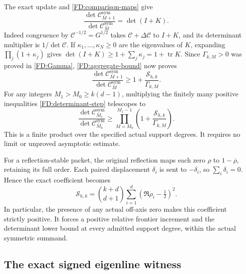 The exact update and \eqref{FD:comparison-maps} give
\begin{equation}
\frac{\det\mathcal C_{M+1}^{\mathrm{sym}}}
{\det\mathcal C_M^{\mathrm{sym}}}=\det(I+K).
\tag{FD.37}\label{FD:determinant-identity}
\end{equation}
Indeed congruence by \(\mathcal C^{-1/2}=G^{1/2}\) takes
\(\mathcal C+\Delta\mathcal C\) to \(I+K\), and its determinant
multiplier is \(1/\det\mathcal C\).  If
\(\kappa_1,\ldots,\kappa_N\ge0\) are the eigenvalues of \(K\),
expanding \(\prod_j(1+\kappa_j)\) gives
\(\det(I+K)\ge1+\sum_j\kappa_j=1+\operatorname{tr}K\).
Since \(\Gamma_{k,M}>0\) was proved in \eqref{FD:Gamma},
\eqref{FD:aggregate-bound} now proves
\begin{equation}
\boxed{\frac{\det\mathcal C_{M+1}^{\mathrm{sym}}}
{\det\mathcal C_M^{\mathrm{sym}}}
\ge1+\frac{\mathcal S_{h,k}}{\Gamma_{k,M}}.}
\tag{FD.38}\label{FD:determinant-step}
\end{equation}
For any integers \(M_1>M_0\ge k(d-1)\), multiplying the finitely many
positive inequalities \eqref{FD:determinant-step} telescopes to
\begin{equation}
\boxed{\frac{\det\mathcal C_{M_1}^{\mathrm{sym}}}
{\det\mathcal C_{M_0}^{\mathrm{sym}}}
\ge\prod_{M=M_0}^{M_1-1}
\left(1+\frac{\mathcal S_{h,k}}{\Gamma_{k,M}}\right).}
\tag{FD.39}\label{FD:determinant-product}
\end{equation}
This is a finite product over the specified actual support degrees.
It requires no limit or unproved asymptotic estimate.

For a reflection-stable packet, the original reflection maps each zero
\(\rho\) to \(1-\overline\rho\), retaining its full order.  Each
paired displacement \(\delta_i\) is sent to \(-\delta_i\), so
\(\sum_i\delta_i=0\).  Hence the exact coefficient becomes
\begin{equation}
\boxed{\mathcal S_{h,k}=\binom{k+d}{d+1}
\sum_{i=1}^d(\Re\rho_i-\tfrac12)^2.}
\tag{FD.40}\label{FD:reflection-coefficient}
\end{equation}
In particular, the presence of any actual off-axis zero makes this
coefficient strictly positive.  It forces a positive relative frontier
increment and the determinant lower bound at every admitted support
degree, within the actual symmetric summand.

\subsection{The exact signed eigenline witness}

